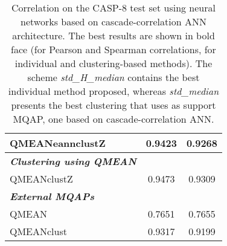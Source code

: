 \begin{table}[htbp]
\begin{tabular}{lcc}
 	QMEANeannclustZ	&0.9423	&0.9268\\
	\midrule                %
	\emph{\textbf{Clustering using QMEAN}} & &\\
	QMEANclustZ	&0.9473	&0.9309\\		
	\midrule                %
	\emph{\textbf{External MQAPs}} & &\\
	QMEAN	&0.7651	&0.7655\\
	QMEANclust	&0.9317	&0.9199\\
\bottomrule                %
\end{tabular}
\caption[Performance on the CASP-8 test set by using neural networks based on ca\-sca\-de-\-cor\-re\-la\-tion ANN architecture]{Correlation on the CASP-8 test set using neural networks based on ca\-sca\-de-\-cor\-re\-la\-tion ANN architecture. The best results are shown in bold face (for Pearson and Spearman correlations, for individual and clustering-based methods). The scheme \emph{std\_H\_median} contains the best individual method proposed, whereas \emph{std\_median} presents the best clustering that uses as support MQAP, one based on ca\-sca\-de-\-cor\-re\-la\-tion ANN.}
\label{tab:casp8_cascade}
\end{table}




